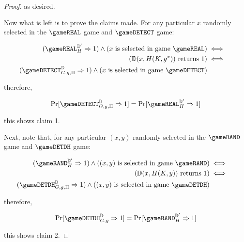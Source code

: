 \begin{proof}
as desired. 

Now what is left is to prove the claims made. For any particular $x$ randomly selected in the $\gameREAL$ game and $\gameDETECT$ game: 

\begin{align*}
(\gameREAL_H^{\mathbb{D'}}\Rightarrow 1) \land (x\text{ is selected in game }\gameREAL) &\iff&\\ (\mathbb{D}(x,H(K,g^x)) \text{ returns 1}) 
&\iff&\\ (\gameDETECT_{G,g,\Pi}^{\mathbb{D}}\Rightarrow 1)\land (x\text{ is selected in game }\gameDETECT)
\end{align*}

therefore, 

$$\Pr[\gameDETECT_{G,g,\Pi}^{\mathbb{D}}\Rightarrow 1] = \Pr[\gameREAL_H^{\mathbb{D'}}\Rightarrow 1]$$

this shows claim 1. 

Next, note that, for any particular $(x,y)$ randomly selected in the $\gameRAND$ game and $\gameDETDH$ game: 

\begin{align*}
(\gameRAND_H^{\mathbb{D'}}\Rightarrow 1) \land ((x,y)\text{ is selected in game }\gameRAND) &\iff&\\ (\mathbb{D}(x,H(K,y)) \text{ returns 1}) 
&\iff&\\ (\gameDETDH_{G,g,\Pi}^{\mathbb{D}}\Rightarrow 1)\land ((x,y)\text{ is selected in game }\gameDETDH)
\end{align*}

therefore, 

$$\Pr[\gameDETDH_{G,g}^{\mathbb{D}}\Rightarrow 1] = \Pr[\gameRAND_H^{\mathbb{D'}}\Rightarrow 1]$$

this shows claim 2.

\end{proof}


